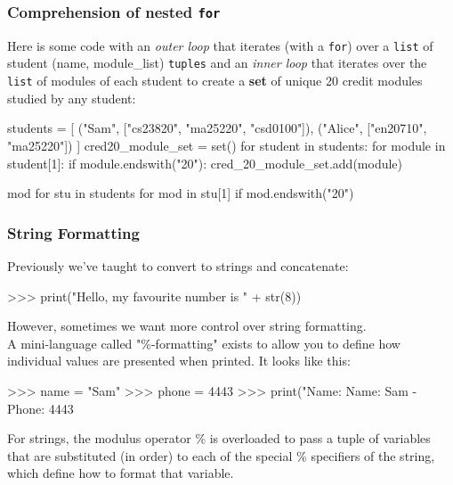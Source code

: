 \documentclass{beamer}
\begin{document}
\begin{frame}[fragile]
\frametitle{Comprehension of nested \texttt{for}}
Here is some code with an \textit{outer loop} that iterates (with a \texttt{for})
over a \texttt{list} of student (name, module\_list) \texttt{tuples} and an
\textit{inner loop} that iterates over the \texttt{list} of modules of each student
to create a \textbf{set} of unique 20 credit modules studied by any student:

\begin{code}
students = [
    ("Sam", ["cs23820", "ma25220", "csd0100"]),
    ("Alice", ["en20710", "ma25220"])
]
cred20_module_set = set()
for student in students:
    for module in student[1]:
        if module.endswith("20"):
            cred_20_module_set.add(module)
\end{code}

\begin{code}
{mod for stu in students
     for mod in stu[1] if mod.endswith("20")}
\end{code}
\end{frame}


\begin{frame}[fragile]
\frametitle{String Formatting}
Previously we've taught to convert to strings and concatenate:
\begin{code}
>>> print("Hello, my favourite number is " + str(8))
\end{code}

\vskip 0.3cm
However, sometimes we want more control over string formatting.\\
A mini-language called "\%-formatting" exists to allow you to define how individual
values are presented when printed.
It looks like this:

\begin{code}
>>> name = "Sam"
>>> phone = 4443
>>> print("Name: %
Name: Sam - Phone: 4443
\end{code}

For strings, the modulus operator \%
is overloaded to pass a tuple of variables that are substituted (in order)
to each of the
special \% specifiers of the string, which define how to format that variable.
\end{frame}
\end{document}
